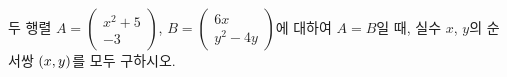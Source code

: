 두 행렬 $A=\begin{pmatrix} x^2+5 \\ -3 \end{pmatrix}$, $B=\begin{pmatrix} 6x \\ y^2-4y \end{pmatrix}$에 대하여 $A=B$일 때, 실수 $x$, $y$의 순서쌍 $(x{,}\mkern3mu\mathopen{}y)$를 모두 구하시오.
